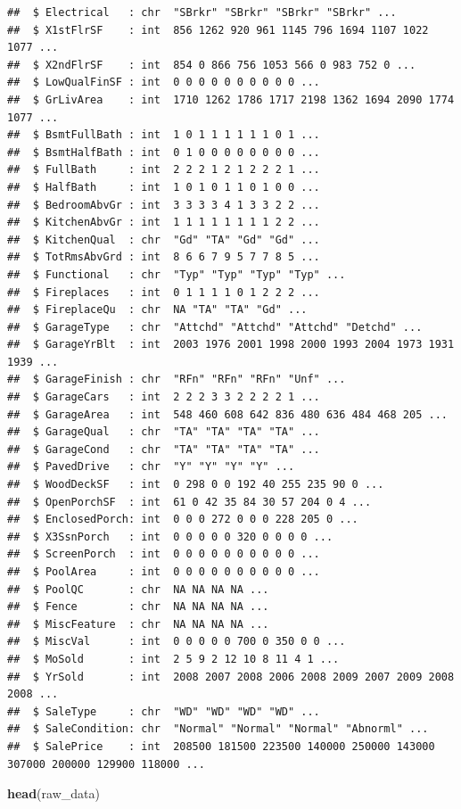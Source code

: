 \documentclass[]{article}
\newenvironment{Shaded}{\begin{snugshade}}{\end{snugshade}}
\newcommand{\KeywordTok}[1]{\textcolor[rgb]{0.13,0.29,0.53}{\textbf{#1}}}
\newcommand{\NormalTok}[1]{#1}
\begin{document}
\begin{verbatim}
##  $ Electrical   : chr  "SBrkr" "SBrkr" "SBrkr" "SBrkr" ...
##  $ X1stFlrSF    : int  856 1262 920 961 1145 796 1694 1107 1022 1077 ...
##  $ X2ndFlrSF    : int  854 0 866 756 1053 566 0 983 752 0 ...
##  $ LowQualFinSF : int  0 0 0 0 0 0 0 0 0 0 ...
##  $ GrLivArea    : int  1710 1262 1786 1717 2198 1362 1694 2090 1774 1077 ...
##  $ BsmtFullBath : int  1 0 1 1 1 1 1 1 0 1 ...
##  $ BsmtHalfBath : int  0 1 0 0 0 0 0 0 0 0 ...
##  $ FullBath     : int  2 2 2 1 2 1 2 2 2 1 ...
##  $ HalfBath     : int  1 0 1 0 1 1 0 1 0 0 ...
##  $ BedroomAbvGr : int  3 3 3 3 4 1 3 3 2 2 ...
##  $ KitchenAbvGr : int  1 1 1 1 1 1 1 1 2 2 ...
##  $ KitchenQual  : chr  "Gd" "TA" "Gd" "Gd" ...
##  $ TotRmsAbvGrd : int  8 6 6 7 9 5 7 7 8 5 ...
##  $ Functional   : chr  "Typ" "Typ" "Typ" "Typ" ...
##  $ Fireplaces   : int  0 1 1 1 1 0 1 2 2 2 ...
##  $ FireplaceQu  : chr  NA "TA" "TA" "Gd" ...
##  $ GarageType   : chr  "Attchd" "Attchd" "Attchd" "Detchd" ...
##  $ GarageYrBlt  : int  2003 1976 2001 1998 2000 1993 2004 1973 1931 1939 ...
##  $ GarageFinish : chr  "RFn" "RFn" "RFn" "Unf" ...
##  $ GarageCars   : int  2 2 2 3 3 2 2 2 2 1 ...
##  $ GarageArea   : int  548 460 608 642 836 480 636 484 468 205 ...
##  $ GarageQual   : chr  "TA" "TA" "TA" "TA" ...
##  $ GarageCond   : chr  "TA" "TA" "TA" "TA" ...
##  $ PavedDrive   : chr  "Y" "Y" "Y" "Y" ...
##  $ WoodDeckSF   : int  0 298 0 0 192 40 255 235 90 0 ...
##  $ OpenPorchSF  : int  61 0 42 35 84 30 57 204 0 4 ...
##  $ EnclosedPorch: int  0 0 0 272 0 0 0 228 205 0 ...
##  $ X3SsnPorch   : int  0 0 0 0 0 320 0 0 0 0 ...
##  $ ScreenPorch  : int  0 0 0 0 0 0 0 0 0 0 ...
##  $ PoolArea     : int  0 0 0 0 0 0 0 0 0 0 ...
##  $ PoolQC       : chr  NA NA NA NA ...
##  $ Fence        : chr  NA NA NA NA ...
##  $ MiscFeature  : chr  NA NA NA NA ...
##  $ MiscVal      : int  0 0 0 0 0 700 0 350 0 0 ...
##  $ MoSold       : int  2 5 9 2 12 10 8 11 4 1 ...
##  $ YrSold       : int  2008 2007 2008 2006 2008 2009 2007 2009 2008 2008 ...
##  $ SaleType     : chr  "WD" "WD" "WD" "WD" ...
##  $ SaleCondition: chr  "Normal" "Normal" "Normal" "Abnorml" ...
##  $ SalePrice    : int  208500 181500 223500 140000 250000 143000 307000 200000 129900 118000 ...
\end{verbatim}

\begin{Shaded}
\begin{Highlighting}[]
\KeywordTok{head}\NormalTok{(raw_data)}
\end{Highlighting}
\end{Shaded}
\end{document}
